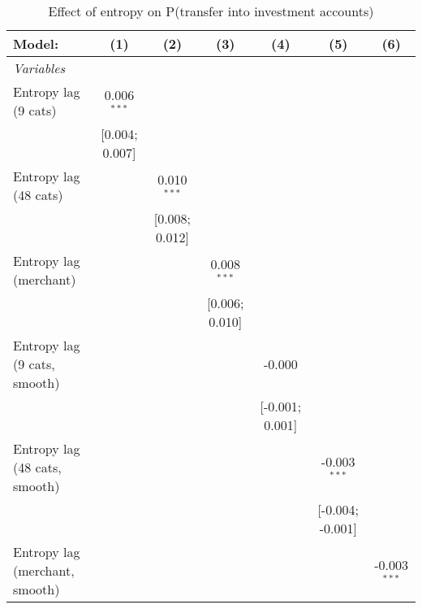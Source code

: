 
\begin{table}[htbp]
   \centering
   \tiny
   \begin{threeparttable}[b]
      \caption{\label{tab:reg_has_investments_lag} Effect of entropy on P(transfer into investment accounts)}
      \begin{tabular}{lcccccc}
         \tabularnewline \midrule \midrule
         Model:                         & (1)            & (2)            & (3)            & (4)             & (5)              & (6)\\  
         \midrule
         \emph{Variables}\\
         Entropy lag (9 cats)           & 0.006$^{***}$  &                &                &                 &                  &   \\   
                                        & [0.004; 0.007] &                &                &                 &                  &   \\   
         Entropy lag (48 cats)          &                & 0.010$^{***}$  &                &                 &                  &   \\   
                                        &                & [0.008; 0.012] &                &                 &                  &   \\   
         Entropy lag (merchant)         &                &                & 0.008$^{***}$  &                 &                  &   \\   
                                        &                &                & [0.006; 0.010] &                 &                  &   \\   
         Entropy lag (9 cats, smooth)   &                &                &                & -0.000          &                  &   \\   
                                        &                &                &                & [-0.001; 0.001] &                  &   \\   
         Entropy lag (48 cats, smooth)  &                &                &                &                 & -0.003$^{***}$   &   \\   
                                        &                &                &                &                 & [-0.004; -0.001] &   \\   
         Entropy lag (merchant, smooth) &                &                &                &                 &                  & -0.003$^{***}$\\   

\end{tabular}
\end{threeparttable}
\end{table}
